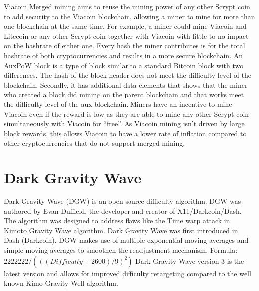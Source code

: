 \documentclass{article}
\begin{document}
Viacoin \cite{auxpow}Merged mining aims to reuse the mining power of any other \cite{scrypt}Scrypt coin
to add security to the Viacoin blockchain,
allowing a miner to mine for more than one blockchain at the same time. For example, a miner
could mine Viacoin and Litecoin or any other Scrypt coin together with Viacoin with little to no impact on the hashrate of either one.
\newline \newline \noindent
Every hash the miner contributes is for the total hashrate of both
cryptocurrencies and results in a more secure blockchain.
An AuxPoW block is a type of block similar to a standard Bitcoin block with two
differences. The hash of the block header does not meet the difficulty level of the
blockchain. Secondly, it has additional data elements that shows that the miner
who created a block did mining on the parent blockchain and that works meet
the difficulty level of the aux blockchain. 
\newline \newline \noindent
Miners have an incentive to mine Viacoin
even if the reward is low as they are able to mine any other Scrypt
coin simultaneously with Viacoin for “free”. As Viacoin mining isn't driven by large block rewards,
this allows Viacoin to have a lower rate of inflation
compared to other cryptocurrencies that do not support merged mining.
\newpage

\section{Dark Gravity Wave}\label{sec: Dark Gravity Wave}
\cite{darkGravityWave}Dark Gravity Wave (DGW) is an open source difficulty algorithm. DGW was
authored by Evan Duffield, the developer and creator of X11/Darkcoin/Dash.
The algorithm was designed to address flaws like the Time warp attack in Kimoto
Gravity Wave algorithm. 
\newline \newline \noindent
Dark Gravity Wave was first introduced in Dash
(Darkcoin). DGW makes use of multiple exponential moving averages and simple
moving averages to smoothen the readjustment mechanism.
\newline Formula: \newline \newline
$2222222/ (((Difficulty+2600)/9)^2)$ \newline \newline \noindent
Dark Gravity Wave version 3 is the latest version and allows for improved difficulty retargeting compared
to the well known Kimo Gravity Well algorithm.
\end{document}

